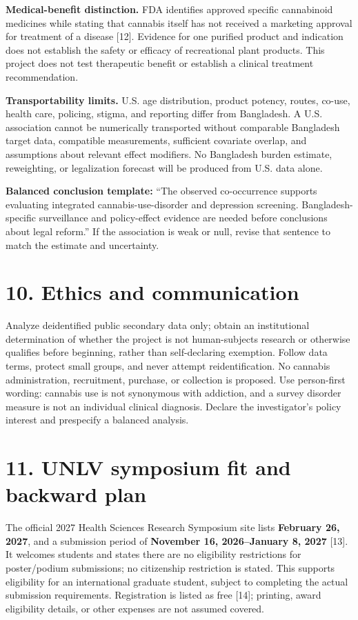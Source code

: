 \documentclass[10pt]{article}
\newcommand{\head}[1]{\section*{\color{navy}#1}}
\begin{document}
\textbf{Medical-benefit distinction.} FDA identifies approved specific cannabinoid medicines while stating that cannabis itself has not received a marketing approval for treatment of a disease [12]. Evidence for one purified product and indication does not establish the safety or efficacy of recreational plant products. This project does not test therapeutic benefit or establish a clinical treatment recommendation.

\textbf{Transportability limits.} U.S. age distribution, product potency, routes, co-use, health care, policing, stigma, and reporting differ from Bangladesh. A U.S. association cannot be numerically transported without comparable Bangladesh target data, compatible measurements, sufficient covariate overlap, and assumptions about relevant effect modifiers. No Bangladesh burden estimate, reweighting, or legalization forecast will be produced from U.S. data alone.

\textbf{Balanced conclusion template:} ``The observed co-occurrence supports evaluating integrated cannabis-use-disorder and depression screening. Bangladesh-specific surveillance and policy-effect evidence are needed before conclusions about legal reform.'' If the association is weak or null, revise that sentence to match the estimate and uncertainty.
\head{10. Ethics and communication}
Analyze deidentified public secondary data only; obtain an institutional determination of whether the project is not human-subjects research or otherwise qualifies before beginning, rather than self-declaring exemption. Follow data terms, protect small groups, and never attempt reidentification. No cannabis administration, recruitment, purchase, or collection is proposed. Use person-first wording: cannabis use is not synonymous with addiction, and a survey disorder measure is not an individual clinical diagnosis. Declare the investigator's policy interest and prespecify a balanced analysis.
\newpage
\head{11. UNLV symposium fit and backward plan}
The official 2027 Health Sciences Research Symposium site lists \textbf{February 26, 2027}, and a submission period of \textbf{November 16, 2026--January 8, 2027} [13]. It welcomes students and states there are no eligibility restrictions for poster/podium submissions; no citizenship restriction is stated. This supports eligibility for an international graduate student, subject to completing the actual submission requirements. Registration is listed as free [14]; printing, award eligibility details, or other expenses are not assumed covered.
\end{document}
